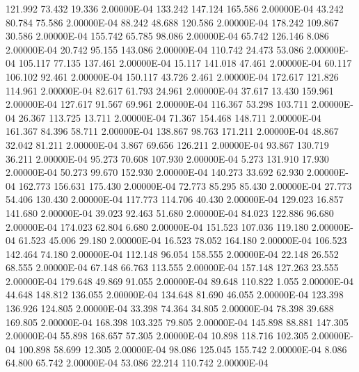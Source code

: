    121.992    73.432    19.336  2.00000E-04
   133.242   147.124   165.586  2.00000E-04
    43.242    80.784    75.586  2.00000E-04
    88.242    48.688   120.586  2.00000E-04
   178.242   109.867    30.586  2.00000E-04
   155.742    65.785    98.086  2.00000E-04
    65.742   126.146     8.086  2.00000E-04
    20.742    95.155   143.086  2.00000E-04
   110.742    24.473    53.086  2.00000E-04
   105.117    77.135   137.461  2.00000E-04
    15.117   141.018    47.461  2.00000E-04
    60.117   106.102    92.461  2.00000E-04
   150.117    43.726     2.461  2.00000E-04
   172.617   121.826   114.961  2.00000E-04
    82.617    61.793    24.961  2.00000E-04
    37.617    13.430   159.961  2.00000E-04
   127.617    91.567    69.961  2.00000E-04
   116.367    53.298   103.711  2.00000E-04
    26.367   113.725    13.711  2.00000E-04
    71.367   154.468   148.711  2.00000E-04
   161.367    84.396    58.711  2.00000E-04
   138.867    98.763   171.211  2.00000E-04
    48.867    32.042    81.211  2.00000E-04
     3.867    69.656   126.211  2.00000E-04
    93.867   130.719    36.211  2.00000E-04
    95.273    70.608   107.930  2.00000E-04
     5.273   131.910    17.930  2.00000E-04
    50.273    99.670   152.930  2.00000E-04
   140.273    33.692    62.930  2.00000E-04
   162.773   156.631   175.430  2.00000E-04
    72.773    85.295    85.430  2.00000E-04
    27.773    54.406   130.430  2.00000E-04
   117.773   114.706    40.430  2.00000E-04
   129.023    16.857   141.680  2.00000E-04
    39.023    92.463    51.680  2.00000E-04
    84.023   122.886    96.680  2.00000E-04
   174.023    62.804     6.680  2.00000E-04
   151.523   107.036   119.180  2.00000E-04
    61.523    45.006    29.180  2.00000E-04
    16.523    78.052   164.180  2.00000E-04
   106.523   142.464    74.180  2.00000E-04
   112.148    96.054   158.555  2.00000E-04
    22.148    26.552    68.555  2.00000E-04
    67.148    66.763   113.555  2.00000E-04
   157.148   127.263    23.555  2.00000E-04
   179.648    49.869    91.055  2.00000E-04
    89.648   110.822     1.055  2.00000E-04
    44.648   148.812   136.055  2.00000E-04
   134.648    81.690    46.055  2.00000E-04
   123.398   136.926   124.805  2.00000E-04
    33.398    74.364    34.805  2.00000E-04
    78.398    39.688   169.805  2.00000E-04
   168.398   103.325    79.805  2.00000E-04
   145.898    88.881   147.305  2.00000E-04
    55.898   168.657    57.305  2.00000E-04
    10.898   118.716   102.305  2.00000E-04
   100.898    58.699    12.305  2.00000E-04
    98.086   125.045   155.742  2.00000E-04
     8.086    64.800    65.742  2.00000E-04
    53.086    22.214   110.742  2.00000E-04
